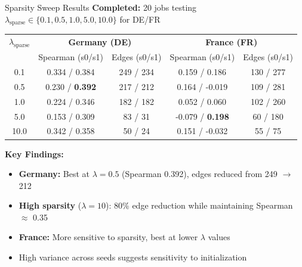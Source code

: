 \documentclass[aspectratio=169]{beamer}
\begin{document}

\begin{frame}{Sparsity Sweep Results}
\textbf{Completed:} 20 jobs testing $\lambda_{\text{sparse}} \in \{0.1, 0.5, 1.0, 5.0, 10.0\}$ for DE/FR

\vspace{0.2cm}
\begin{table}
\centering
\small
\begin{tabular}{c|cc|cc}
\toprule
$\lambda_{\text{sparse}}$ & \multicolumn{2}{c|}{\textbf{Germany (DE)}} & \multicolumn{2}{c}{\textbf{France (FR)}} \\
& Spearman (s0/s1) & Edges (s0/s1) & Spearman (s0/s1) & Edges (s0/s1) \\
\midrule
0.1 & 0.334 / 0.384 & 249 / 234 & 0.159 / 0.186 & 130 / 277 \\
0.5 & 0.230 / \textbf{0.392} & 217 / 212 & 0.164 / -0.019 & 109 / 281 \\
1.0 & 0.224 / 0.346 & 182 / 182 & 0.052 / 0.060 & 102 / 260 \\
5.0 & 0.153 / 0.309 & 83 / 31 & -0.079 / \textbf{0.198} & 60 / 180 \\
10.0 & 0.342 / 0.358 & 50 / 24 & 0.151 / -0.032 & 55 / 75 \\
\bottomrule
\end{tabular}
\end{table}

\vspace{0.2cm}
\textbf{Key Findings:}
\begin{itemize}
    \item \textbf{Germany:} Best at $\lambda=0.5$ (Spearman 0.392), edges reduced from 249 $\rightarrow$ 212
    \item \textbf{High sparsity} ($\lambda=10$): 80\% edge reduction while maintaining Spearman $\approx$ 0.35
    \item \textbf{France:} More sensitive to sparsity, best at lower $\lambda$ values
    \item High variance across seeds suggests sensitivity to initialization
\end{itemize}
\end{frame}
\end{document}
